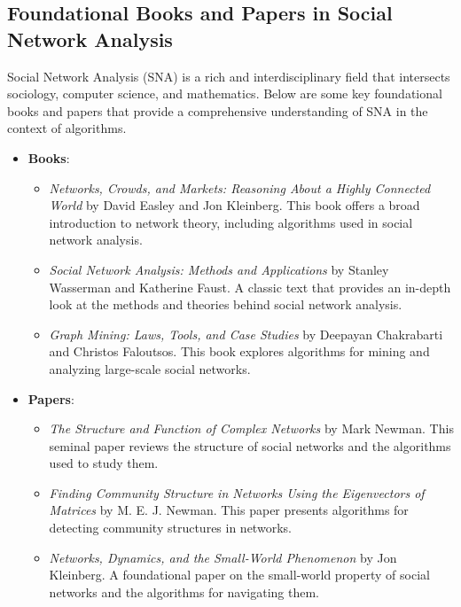 \documentclass[12pt]{book} %
\begin{document}
\subsection{Foundational Books and Papers in Social Network Analysis}
Social Network Analysis (SNA) is a rich and interdisciplinary field that intersects sociology, computer science, and mathematics. Below are some key foundational books and papers that provide a comprehensive understanding of SNA in the context of algorithms.

\begin{itemize}
    \item \textbf{Books}:
        \begin{itemize}
            \item \textit{Networks, Crowds, and Markets: Reasoning About a Highly Connected World} by David Easley and Jon Kleinberg. This book offers a broad introduction to network theory, including algorithms used in social network analysis.
            \item \textit{Social Network Analysis: Methods and Applications} by Stanley Wasserman and Katherine Faust. A classic text that provides an in-depth look at the methods and theories behind social network analysis.
            \item \textit{Graph Mining: Laws, Tools, and Case Studies} by Deepayan Chakrabarti and Christos Faloutsos. This book explores algorithms for mining and analyzing large-scale social networks.
        \end{itemize}
    
    \item \textbf{Papers}:
        \begin{itemize}
            \item \textit{The Structure and Function of Complex Networks} by Mark Newman. This seminal paper reviews the structure of social networks and the algorithms used to study them.
            \item \textit{Finding Community Structure in Networks Using the Eigenvectors of Matrices} by M. E. J. Newman. This paper presents algorithms for detecting community structures in networks.
            \item \textit{Networks, Dynamics, and the Small-World Phenomenon} by Jon Kleinberg. A foundational paper on the small-world property of social networks and the algorithms for navigating them.
        \end{itemize}
\end{itemize}
\end{document}
